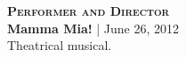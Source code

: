 \textbf{\textsc{Performer and Director}} \\
\textbf{Mamma Mia!} | June 26, 2012 \\
Theatrical musical.
\begin{center}
    \label{fig:mamma_mia}	
\end{center}